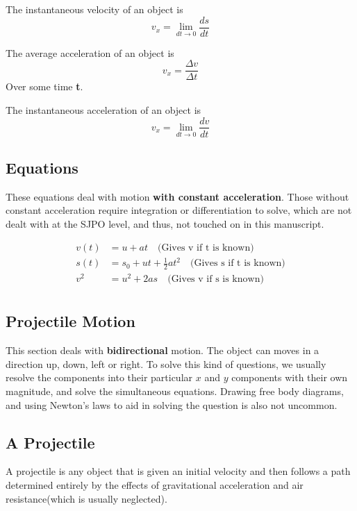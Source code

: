 \begin{form}
The instantaneous velocity of an object is
$$v_x = \lim_{d t \rightarrow 0} \frac{d s}{d t}$$
\end{form}

\begin{form}
The average acceleration of an object is
$$v_x =\frac{\Delta v}{\Delta t}$$
Over some time \textbf{t}.
\end{form}

\begin{form} 
The instantaneous acceleration of an object is
$$v_x= \lim_{d t \rightarrow 0} \frac{d v}{d t}$$
\end{form}
\subsection{Equations}
These equations deal with motion \textbf{with constant acceleration}. Those without constant acceleration require integration or differentiation to solve, which are not dealt with at the SJPO level, and thus, not touched on in this manuscript.

\begin{form}
\begin{equation}
\begin{split}
v(t)&= u + at \quad \text{(Gives v if t is known)}\\ 
s(t)&=s_{0}+u t+ \frac{1}{2}at^{2} \quad \text{(Gives s if t is known)}\\
v^2 &= u^2 +2as \quad \text{(Gives v if s is known)}\\
\end{split}
\end{equation}
\end{form}

\subsection{Projectile Motion} \label{projectile}
This section deals with \textbf{bidirectional} motion. The object can moves in a direction up, down, left or right. To solve this kind of questions, we usually resolve the components into their particular $x$ and $y$ components with their own  magnitude, and solve the simultaneous equations. Drawing free body diagrams, and using Newton's laws to aid in solving the question is also not uncommon.

\subsection{A Projectile}
A projectile is any object that is given an initial velocity and then follows a path determined entirely by the effects of gravitational acceleration and air resistance(which is usually neglected). 

